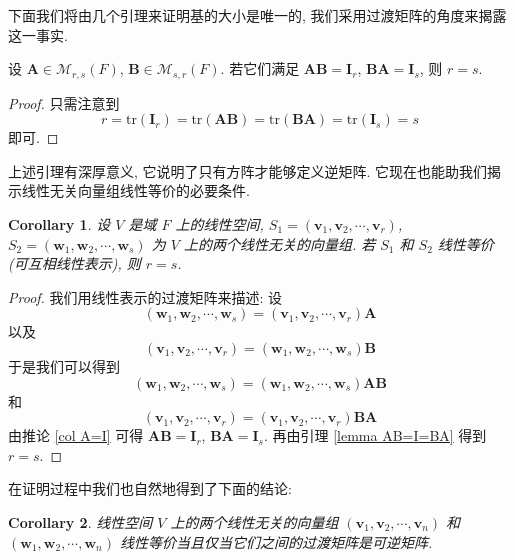 \documentclass[UTF8]{book}
\newtheorem{corollary}{Corollary}[section]
\begin{document}
下面我们将由几个引理来证明基的大小是唯一的, 
我们采用过渡矩阵的角度来揭露这一事实. 

\begin{lemma} \label{lemma AB=I=BA}
    设 $\boldsymbol{A}\in \mathcal{M}_{r,s}(F)$, 
    $\boldsymbol{B}\in \mathcal{M}_{s,r}(F)$. 
    若它们满足 $\boldsymbol{A}\boldsymbol{B} = \boldsymbol{I}_r$, 
    $\boldsymbol{B}\boldsymbol{A} = \boldsymbol{I}_s$, 
    则 $r=s$. 
\end{lemma}

\begin{proof}
    只需注意到 
    $$ r = \mathrm{tr}(\boldsymbol{I}_r) = 
    \mathrm{tr}(\boldsymbol{A}\boldsymbol{B})=
    \mathrm{tr}(\boldsymbol{B}\boldsymbol{A})= 
    \mathrm{tr}(\boldsymbol{I}_s) = s$$
    即可. 
\end{proof}

上述引理有深厚意义, 它说明了只有方阵才能够定义逆矩阵. 
它现在也能助我们揭示线性无关向量组线性等价的必要条件. 

\begin{corollary}
    设 $V$ 是域 $F$ 上的线性空间, 
    $S_1 = (\boldsymbol{v}_1,\boldsymbol{v}_2,\cdots,\boldsymbol{v}_r)$, 
    $S_2 = (\boldsymbol{w}_1,\boldsymbol{w}_2,\cdots,\boldsymbol{w}_s)$ 
    为 $V$ 上的两个线性无关的向量组. 
    若 $S_1$ 和 $S_2$ 线性等价 (可互相线性表示), 则 $r=s$. 
\end{corollary}

\begin{proof}
    我们用线性表示的过渡矩阵来描述: 
    设 
    $$
    (\boldsymbol{w}_1,\boldsymbol{w}_2,\cdots,\boldsymbol{w}_s) = 
    (\boldsymbol{v}_1,\boldsymbol{v}_2,\cdots,\boldsymbol{v}_r)
    \boldsymbol{A}
    $$
    以及 
    $$
    (\boldsymbol{v}_1,\boldsymbol{v}_2,\cdots,\boldsymbol{v}_r)=
    (\boldsymbol{w}_1,\boldsymbol{w}_2,\cdots,\boldsymbol{w}_s) 
    \boldsymbol{B}
    $$
    于是我们可以得到 
    $$
    (\boldsymbol{w}_1,\boldsymbol{w}_2,\cdots,\boldsymbol{w}_s) = 
    (\boldsymbol{w}_1,\boldsymbol{w}_2,\cdots,\boldsymbol{w}_s)
    \boldsymbol{AB}
    $$
    和
    $$
    (\boldsymbol{v}_1,\boldsymbol{v}_2,\cdots,\boldsymbol{v}_r) = 
    (\boldsymbol{v}_1,\boldsymbol{v}_2,\cdots,\boldsymbol{v}_r)
    \boldsymbol{BA}
    $$
    由推论 \ref{col A=I} 可得 
    $\boldsymbol{A}\boldsymbol{B} = \boldsymbol{I}_r$, 
    $\boldsymbol{B}\boldsymbol{A} = \boldsymbol{I}_s$. 
    再由引理 \ref{lemma AB=I=BA} 得到 $r=s$. 
\end{proof}

在证明过程中我们也自然地得到了下面的结论: 
\begin{corollary}\label{coro bridge matrix}
    线性空间 $V$ 上的两个线性无关的向量组 
    $(\boldsymbol{v}_1,\boldsymbol{v}_2,\cdots,\boldsymbol{v}_n)$ 
    和 $(\boldsymbol{w}_1,\boldsymbol{w}_2,\cdots,\boldsymbol{w}_n)$
    线性等价当且仅当它们之间的过渡矩阵是可逆矩阵. 
\end{corollary}
\end{document}
